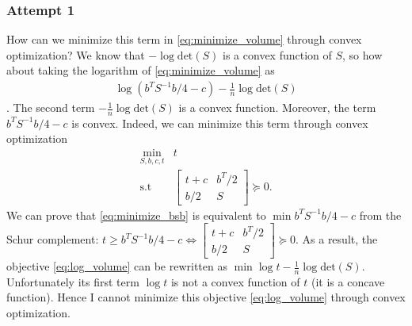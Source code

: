 \documentclass{article}
\begin{document}
\subsubsection{Attempt 1}
How can we minimize this term in \eqref{eq:minimize_volume} through convex optimization? We know that $-\log\text{det}(S)$ is a convex function of $S$, so how about taking the logarithm of \eqref{eq:minimize_volume} as
\begin{align}
	\log(b^TS^{-1}b/4-c) - \frac{1}{n}\log\text{det}(S) \label{eq:log_volume}
\end{align}
. The second term $-\frac{1}{n}\log\text{det}(S)$ is a convex function. Moreover, the term $b^TS^{-1}b/4-c$ is convex. Indeed, we can minimize this term through convex optimization
\begin{subequations}
\begin{align}
	\min_{S, b, c, t}& t\\
	\text{s.t }& \begin{bmatrix} t + c & b^T/2\\ b/2 & S \end{bmatrix} \succeq 0.
\end{align}
\label{eq:minimize_bsb}
\end{subequations}
We can prove that \eqref{eq:minimize_bsb} is equivalent to $\min b^TS^{-1}b/4-c$ from the Schur complement: $t \ge b^TS^{-1}b/4-c \Leftrightarrow \begin{bmatrix} t+c & b^T/2 \\b/2 & S \end{bmatrix} \succeq 0$. As a result, the objective \eqref{eq:log_volume} can be rewritten as $\min \log t - \frac{1}{n}\log\text{det}(S)$. Unfortunately its first term $\log t$ is not a convex function of $t$ (it is a concave function). Hence I cannot minimize this objective \eqref{eq:log_volume} through convex optimization.
\end{document}

